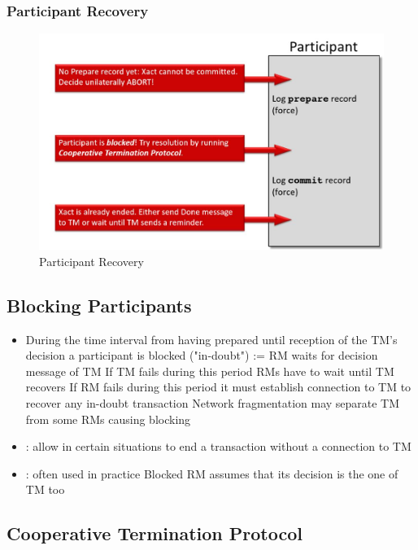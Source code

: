 			\pagebreak
			\subsubsection{Participant Recovery}
				\begin{figure}[h!]
					\includegraphics[scale=0.25]{res/participant_recovery.jpg}
					\caption{Participant Recovery}
				\end{figure}
			
			
		\subsection{Blocking Participants}
			\begin{itemize}
				\item During the time interval from having prepared until reception of the TM's decision a participant is blocked ("in-doubt") 
					\subitem {}:= RM waits for decision message of TM 
					\subitem If TM fails during this period RMs have to wait until TM recovers 
					\subitem If RM fails during this period it must establish connection to TM to recover any in-doubt transaction 
					\subitem Network fragmentation may separate TM from some RMs causing blocking
				\item {}: allow in certain situations to end a transaction without a connection to TM 
				\item  {}: often used in practice 
					\subitem Blocked RM assumes that its decision is the one of TM too
					
		\end{itemize}
		
		\subsection{Cooperative Termination Protocol}
		
